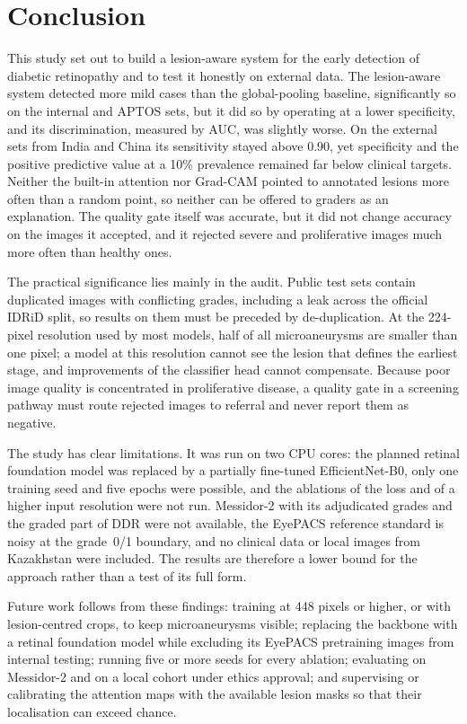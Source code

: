 \documentclass[11pt,a4paper]{article}
\begin{document}
\section{Conclusion}\label{sec:conc}
This study set out to build a lesion-aware system for the early detection of diabetic retinopathy and to test it honestly on external data. The lesion-aware system detected more mild cases than the global-pooling baseline, significantly so on the internal and APTOS sets, but it did so by operating at a lower specificity, and its discrimination, measured by AUC, was slightly worse. On the external sets from India and China its sensitivity stayed above 0.90, yet specificity and the positive predictive value at a 10\% prevalence remained far below clinical targets. Neither the built-in attention nor Grad-CAM pointed to annotated lesions more often than a random point, so neither can be offered to graders as an explanation. The quality gate itself was accurate, but it did not change accuracy on the images it accepted, and it rejected severe and proliferative images much more often than healthy ones.

The practical significance lies mainly in the audit. Public test sets contain duplicated images with conflicting grades, including a leak across the official IDRiD split, so results on them must be preceded by de-duplication. At the 224-pixel resolution used by most models, half of all microaneurysms are smaller than one pixel; a model at this resolution cannot see the lesion that defines the earliest stage, and improvements of the classifier head cannot compensate. Because poor image quality is concentrated in proliferative disease, a quality gate in a screening pathway must route rejected images to referral and never report them as negative.

The study has clear limitations. It was run on two CPU cores: the planned retinal foundation model was replaced by a partially fine-tuned EfficientNet-B0, only one training seed and five epochs were possible, and the ablations of the loss and of a higher input resolution were not run. Messidor-2 with its adjudicated grades and the graded part of DDR were not available, the EyePACS reference standard is noisy at the grade~0/1 boundary, and no clinical data or local images from Kazakhstan were included. The results are therefore a lower bound for the approach rather than a test of its full form.

Future work follows from these findings: training at 448 pixels or higher, or with lesion-centred crops, to keep microaneurysms visible; replacing the backbone with a retinal foundation model while excluding its EyePACS pretraining images from internal testing; running five or more seeds for every ablation; evaluating on Messidor-2 and on a local cohort under ethics approval; and supervising or calibrating the attention maps with the available lesion masks so that their localisation can exceed chance.
\end{document}
